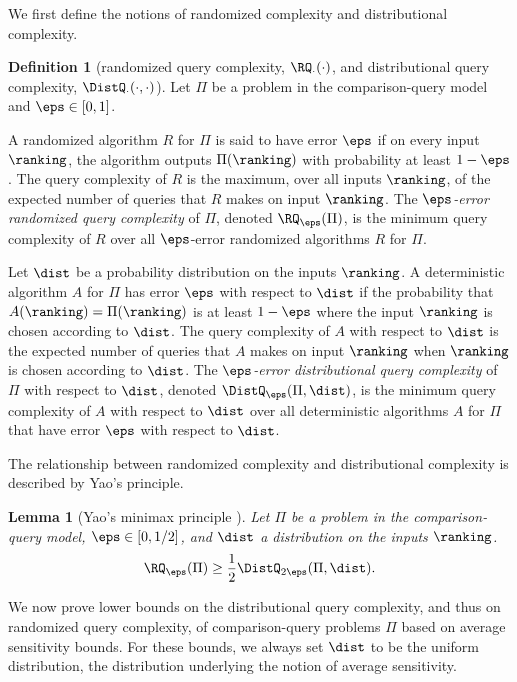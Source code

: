\documentclass[11pt]{article}
\numberwithin{equation}{section}
\newtheorem{lemma}[theorem]{Lemma}
\theoremstyle{definition}
\newtheorem{definition}[theorem]{Definition}
\theoremstyle{plain}
\begin{document}
We first define the notions of randomized complexity and distributional complexity.

\begin{definition}[randomized query complexity, $\RQ_{\cdot}(\cdot)$, and distributional query complexity, $\DistQ_\cdot(\cdot, \cdot)$]
Let $\Pi$ be a problem in the comparison-query model and $\eps \in [0,1]$.

A randomized algorithm $R$ for $\Pi$ is said to have error $\eps$ if on every input $\ranking$, the algorithm outputs $\Pi(\ranking)$ with probability at least $1-\eps$. The query complexity of $R$ is the maximum, over all inputs $\ranking$, of the expected number of queries that $R$ makes on input $\ranking$. The \emph{$\eps$-error randomized query complexity} of $\Pi$, denoted $\RQ_{\eps}(\Pi)$, is the minimum query complexity of $R$ over all $\eps$-error randomized algorithms $R$ for $\Pi$.

Let $\dist$ be a probability distribution on the inputs $\ranking$. A deterministic algorithm $A$ for $\Pi$ has error $\eps$ with respect to $\dist$ if the probability that $A(\ranking)=\Pi(\ranking)$ is at least $1-\eps$ where the input $\ranking$ is chosen according to $\dist$. The query complexity of $A$ with respect to $\dist$ is the expected number of queries that $A$ makes on input $\ranking$ when $\ranking$ is chosen according to $\dist$. The \emph{$\eps$-error distributional query complexity} of $\Pi$ with respect to $\dist$, denoted $\DistQ_{\eps}(\Pi,\dist)$, is the minimum query complexity of $A$ with respect to $\dist$ over all deterministic algorithms $A$ for $\Pi$ that have error $\eps$ with respect to $\dist$.
\end{definition}

The relationship between randomized complexity and distributional complexity is described by Yao's principle. 

\begin{lemma}[Yao's minimax principle \cite{Yao77}]
	\label{lemma:yaos-principle}
	Let $\Pi$ be a problem in the comparison-query model, $\eps \in [0,1/2]$, and $\dist$ a distribution on the inputs $\ranking$.
	\begin{equation}\label{eq:yao}
	\RQ_{\eps}(\Pi) \ge \frac{1}{2}\DistQ_{2\eps}(\Pi, \dist). 
	\end{equation}
\end{lemma}

We now prove lower bounds on the distributional query complexity, and thus on randomized query complexity, of comparison-query problems $\Pi$ based on average sensitivity bounds. For these bounds, we always set $\dist$ to be the uniform distribution, the distribution underlying the notion of average sensitivity. 
\end{document}
